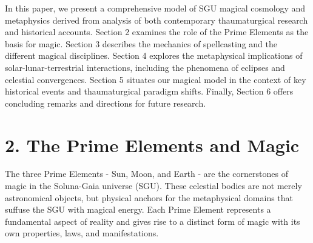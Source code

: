 \documentclass[12pt]{article}
\begin{document}
In this paper, we present a comprehensive model of SGU magical cosmology and metaphysics derived from analysis of both contemporary thaumaturgical research and historical accounts. Section 2 examines the role of the Prime Elements as the basis for magic. Section 3 describes the mechanics of spellcasting and the different magical disciplines. Section 4 explores the metaphysical implications of solar-lunar-terrestrial interactions, including the phenomena of eclipses and celestial convergences. Section 5 situates our magical model in the context of key historical events and thaumaturgical paradigm shifts. Finally, Section 6 offers concluding remarks and directions for future research.

\section{2. The Prime Elements and Magic}

The three Prime Elements - Sun, Moon, and Earth - are the cornerstones of magic in the Soluna-Gaia universe (SGU). These celestial bodies are not merely astronomical objects, but physical anchors for the metaphysical domains that suffuse the SGU with magical energy. Each Prime Element represents a fundamental aspect of reality and gives rise to a distinct form of magic with its own properties, laws, and manifestations.
\end{document}
